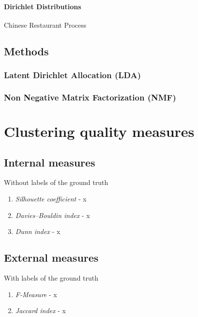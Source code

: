     \paragraph{Dirichlet Distributions}
      Chinese Restaurant Process

  \subsection{Methods}
    \subsubsection{Latent Dirichlet Allocation (LDA)}
    \subsubsection{Non Negative Matrix Factorization (NMF)}


\section{Clustering quality measures}

  \subsection{Internal measures}
    Without labels of the ground truth

    \begin{enumerate}
      \item \emph{Silhouette coefficient} - x
      \item \emph{Davies–Bouldin index} - x
      \item \emph{Dunn index} - x
    \end{enumerate}

  \subsection{External measures}
    With labels of the ground truth

    \begin{enumerate}
      \item \emph{F-Measure} - x
      \item \emph{Jaccard index} - x
    \end{enumerate}

